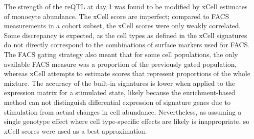 %
The strength of the  \gls{reQTL} at day 1 was found to be modified by xCell estimates of monocyte abundance. 
%
The xCell score are imperfect; compared to FACS measurements in a cohort subset, the xCell scores were only weakly correlated.
Some discrepancy is expected, as the cell types as defined in the xCell signatures do not directly correspond to the combinations of surface markers used for FACS.
The FACS gating strategy also meant that for some cell populations, the only available FACS measure was a proportion of the previously gated population,
whereas xCell attempts to estimate scores that represent proportions of the whole mixture.
The accuracy of the built-in signatures is lower when applied to the expression matrix for a stimulated state,
likely because the enrichment-based method can not distinguish differential expression of signature genes due to stimulation from actual changes in cell abundance.
Nevertheless, as assuming a single genotype effect where cell type-specific effects are likely is inappropriate, so xCell scores were used as a best approximation.
%

